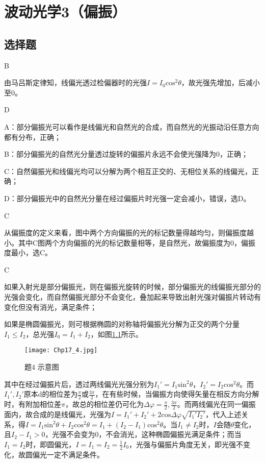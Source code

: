 \chapter{波动光学3（偏振）}
\section{选择题}
\exercise B

\solve 由马吕斯定律知，线偏光透过检偏器时的光强$I=I_0\mathrm{cos}^2\theta$，故光强先增加，后减小至0。

\exercise D

\solve A：部分偏振光可以看作是线偏光和自然光的合成，而自然光的光振动沿任意方向都有分布，正确；

B：部分偏振光的自然光分量透过旋转的偏振片永远不会使光强降为0，正确；

C：自然偏振光和线偏光均可以分解为两个相互正交的、无相位关系的线偏光，正确；

D：部分偏振光中的自然光分量在经过偏振片时光强一定会减小，错误，选D。

\exercise C

\solve 从偏振度的定义来看，图中两个方向偏振的光的标记数量得越均匀，则偏振度越小。其中C图两个方向偏振的光的标记数量相等，是自然光，故偏振度为0，偏振度最小，选C。

\exercise C

\solve 如果入射光是部分偏振光，则在偏振光旋转的时候，部分偏振光的线偏振光部分的光强会变化，而自然偏振光部分不会变化，叠加起来导致出射光强对偏振片转动有变化但没有消光，满足条件；

如果是椭圆偏振光，则可根据椭圆的对称轴将偏振光分解为正交的两个分量$I_1\leqslant I_2$，总光强$I_0=I_1+I_2$，如图\ref{4}所示。

\begin{figure}[htbp]
	\centering
	\texttt{[image: Chp17\_4.jpg]}
	\caption{题4 示意图}
	\label{4}
\end{figure}

其中在经过偏振片后，透过两线偏光光强分别为$I_1'=I_1\mathrm{sin}^2\theta$，$I_2'=I_2\mathrm{cos}^2\theta$。而$I_1',I_2'$原本d的相位差为$\frac{\pi}{2}$或$\frac{3\pi}{2}$，在有些时候，当偏振方向使得矢量在相反方向分解时，有附加相位差$\pi$，故总的相位差仍可化为$\Delta \varphi=\frac{\pi}{2},\frac{3\pi}{2}$。而两线偏光在同一偏振面内，故合成的是线偏光，光强为$I=I_1'+I_2'+2\mathrm{cos}\Delta \varphi\sqrt{I_1'I_2'}$，代入上述关系，得$I=I_1\mathrm{sin}^2\theta+I_2\mathrm{cos}^2\theta=I_1+(I_2-I_1)\mathrm{cos}^2\theta$。当$I_1\not= I_2$时，$I$会随$\theta$变化，且$I_2-I_1>0$，光强不会变为0，不会消光，这种椭圆偏振光满足条件；而当$I_1=I_2$时，即圆偏光，$I=I_1=I_2=\frac{1}{2}I_0$，光强与偏振片角度无关，即光强不变化，故圆偏光一定不满足条件。

